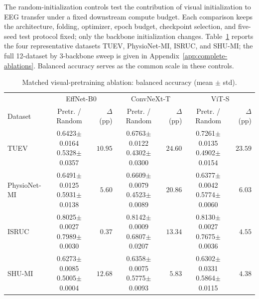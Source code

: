 The random-initialization controls test the contribution of visual
initialization to EEG transfer under a fixed downstream compute budget. Each comparison keeps the architecture, folding, optimizer,
epoch budget, checkpoint selection, and five-seed test protocol fixed; only
the backbone initialization changes. Table~\ref{tab:vision-pretraining-ablation}
reports the four representative datasets TUEV, PhysioNet-MI, ISRUC, and SHU-MI;
the full 12-dataset by 3-backbone sweep is given in Appendix~\ref{app:complete-ablations}.
Balanced accuracy serves as the common scale in these controls.

\begin{table}[t]
\centering\footnotesize
\setlength{\tabcolsep}{3pt}
\caption{Matched visual-pretraining ablation: balanced accuracy (mean $\pm$ std).}
\label{tab:vision-pretraining-ablation}
\begin{tabular}{@{}l*{3}{cr}@{}}
\toprule
 & \multicolumn{2}{c}{EffNet-B0} & \multicolumn{2}{c}{ConvNeXt-T} & \multicolumn{2}{c}{ViT-S} \\
\cmidrule(lr){2-3}\cmidrule(lr){4-5}\cmidrule(l){6-7}
Dataset & Pretr. / Random & $\Delta$ (pp) & Pretr. / Random & $\Delta$ (pp) & Pretr. / Random & $\Delta$ (pp) \\
\midrule
TUEV & \shortstack{0.6423$\pm$0.0164\\0.5328$\pm$0.0357} & $10.95$ & \shortstack{0.6763$\pm$0.0122\\0.4302$\pm$0.0300} & $24.60$ & \shortstack{0.7261$\pm$0.0135\\0.4902$\pm$0.0154} & $23.59$ \\
\cmidrule(lr){1-7}
PhysioNet-MI & \shortstack{0.6491$\pm$0.0125\\0.5931$\pm$0.0138} & $5.60$ & \shortstack{0.6609$\pm$0.0079\\0.4523$\pm$0.0089} & $20.86$ & \shortstack{0.6377$\pm$0.0042\\0.5774$\pm$0.0060} & $6.03$ \\
\cmidrule(lr){1-7}
ISRUC & \shortstack{0.8025$\pm$0.0027\\0.7989$\pm$0.0030} & $0.37$ & \shortstack{0.8142$\pm$0.0009\\0.6807$\pm$0.0207} & $13.34$ & \shortstack{0.8130$\pm$0.0027\\0.7675$\pm$0.0036} & $4.55$ \\
\cmidrule(lr){1-7}
SHU-MI & \shortstack{0.6273$\pm$0.0085\\0.5005$\pm$0.0004} & $12.68$ & \shortstack{0.6358$\pm$0.0075\\0.5775$\pm$0.0093} & $5.83$ & \shortstack{0.6302$\pm$0.0331\\0.5864$\pm$0.0115} & $4.38$ \\
\bottomrule
\end{tabular}

\end{table}

